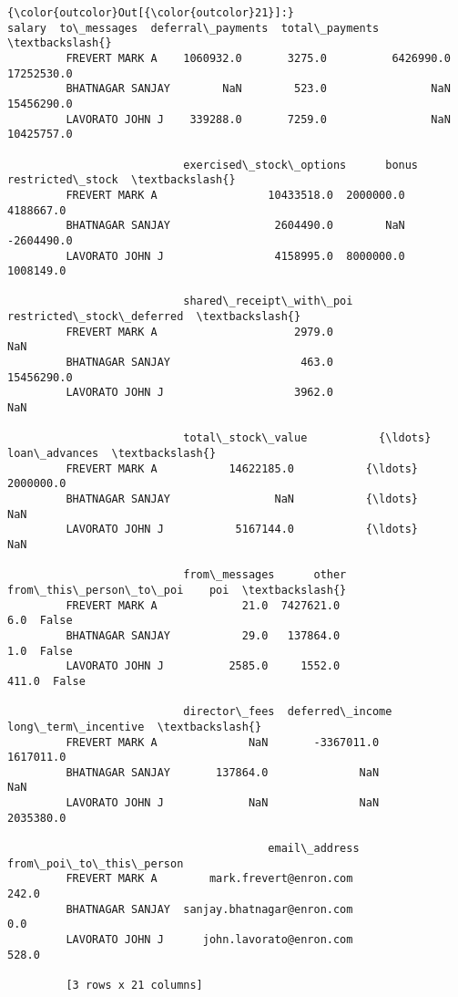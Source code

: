 \documentclass[11pt]{article}
\begin{document}
\begin{Verbatim}[commandchars=\\\{\}]
{\color{outcolor}Out[{\color{outcolor}21}]:}                      salary  to\_messages  deferral\_payments  total\_payments  \textbackslash{}
         FREVERT MARK A    1060932.0       3275.0          6426990.0      17252530.0   
         BHATNAGAR SANJAY        NaN        523.0                NaN      15456290.0   
         LAVORATO JOHN J    339288.0       7259.0                NaN      10425757.0   
         
                           exercised\_stock\_options      bonus  restricted\_stock  \textbackslash{}
         FREVERT MARK A                 10433518.0  2000000.0         4188667.0   
         BHATNAGAR SANJAY                2604490.0        NaN        -2604490.0   
         LAVORATO JOHN J                 4158995.0  8000000.0         1008149.0   
         
                           shared\_receipt\_with\_poi  restricted\_stock\_deferred  \textbackslash{}
         FREVERT MARK A                     2979.0                        NaN   
         BHATNAGAR SANJAY                    463.0                 15456290.0   
         LAVORATO JOHN J                    3962.0                        NaN   
         
                           total\_stock\_value           {\ldots}            loan\_advances  \textbackslash{}
         FREVERT MARK A           14622185.0           {\ldots}                2000000.0   
         BHATNAGAR SANJAY                NaN           {\ldots}                      NaN   
         LAVORATO JOHN J           5167144.0           {\ldots}                      NaN   
         
                           from\_messages      other  from\_this\_person\_to\_poi    poi  \textbackslash{}
         FREVERT MARK A             21.0  7427621.0                      6.0  False   
         BHATNAGAR SANJAY           29.0   137864.0                      1.0  False   
         LAVORATO JOHN J          2585.0     1552.0                    411.0  False   
         
                           director\_fees  deferred\_income  long\_term\_incentive  \textbackslash{}
         FREVERT MARK A              NaN       -3367011.0            1617011.0   
         BHATNAGAR SANJAY       137864.0              NaN                  NaN   
         LAVORATO JOHN J             NaN              NaN            2035380.0   
         
                                        email\_address from\_poi\_to\_this\_person  
         FREVERT MARK A        mark.frevert@enron.com                   242.0  
         BHATNAGAR SANJAY  sanjay.bhatnagar@enron.com                     0.0  
         LAVORATO JOHN J      john.lavorato@enron.com                   528.0  
         
         [3 rows x 21 columns]
\end{Verbatim}
            
\end{document}
